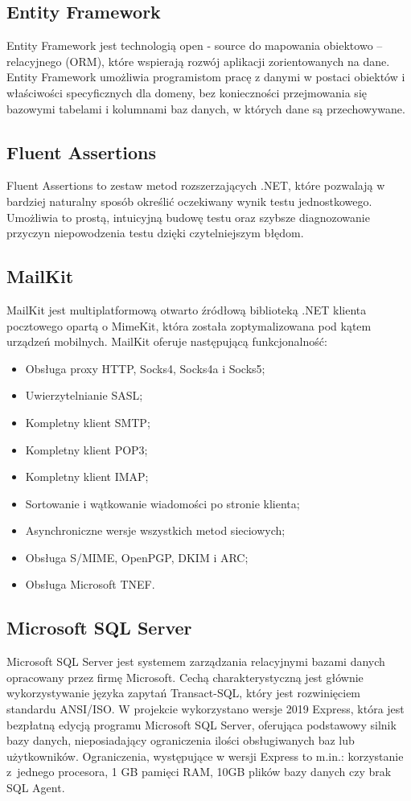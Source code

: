 \documentclass[12pt,a4paper]{article}
\begin{document}
		\subsection{Entity Framework}		 
		 	\indent Entity Framework jest technologią open - source do mapowania obiektowo – relacyjnego (ORM), które wspierają rozwój aplikacji zorientowanych na dane.
		 	Entity Framework umożliwia programistom pracę z danymi w postaci obiektów i właściwości specyficznych dla domeny, bez konieczności przejmowania się bazowymi
		 	tabelami i kolumnami baz danych, w których dane są przechowywane. 

		\subsection{Fluent Assertions}
			\indent Fluent Assertions to zestaw metod rozszerzających .NET, które pozwalają
			w bardziej naturalny sposób określić oczekiwany wynik testu jednostkowego.
			Umożliwia to prostą, intuicyjną budowę testu oraz szybsze diagnozowanie przyczyn
			niepowodzenia testu dzięki czytelniejszym błędom.

		\subsection{MailKit}
			\indent MailKit jest multiplatformową otwarto źródłową biblioteką .NET klienta pocztowego opartą o MimeKit, która została zoptymalizowana pod kątem urządzeń mobilnych.
			MailKit oferuje następującą funkcjonalność:
			\begin{itemize}
				\item Obsługa proxy HTTP, Socks4, Socks4a i Socks5;
				\item Uwierzytelnianie SASL;
				\item Kompletny klient SMTP;
				\item Kompletny klient POP3;
				\item Kompletny klient IMAP;
				\item Sortowanie i wątkowanie wiadomości po stronie klienta;
				\item Asynchroniczne wersje wszystkich metod sieciowych;
				\item Obsługa S/MIME, OpenPGP, DKIM i ARC;
				\item Obsługa Microsoft TNEF.
			\end{itemize}

		\subsection{Microsoft SQL Server}		 
		 	\indent Microsoft SQL Server jest systemem zarządzania relacyjnymi bazami danych opracowany przez firmę Microsoft. Cechą charakterystyczną jest głównie wykorzystywanie języka
		 	zapytań	Transact-SQL, który jest rozwinięciem standardu ANSI/ISO. W projekcie wykorzystano wersje 2019 Express, która jest bezpłatną edycją programu Microsoft SQL Server, oferująca
		 	podstawowy silnik bazy danych, nieposiadający ograniczenia ilości obsługiwanych baz lub użytkowników. Ograniczenia, występujące w wersji Express to  m.in.:
		 	korzystanie z~jednego procesora, 1 GB pamięci RAM, 10GB plików bazy danych czy brak SQL Agent.
		
\end{document}
